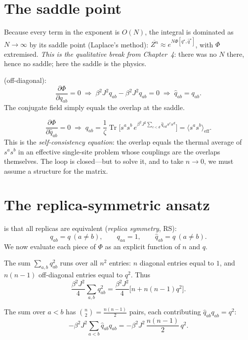 \documentclass[nobib,justified]{tufte-handout}
\newcommand{\dbar}[1]{\overline{#1}}
\newcommand{\Tr}{\operatorname{Tr}}
\begin{document}
\section{The saddle point}

Because every term in the exponent is $O(N)$, the integral is dominated as
$N\to\infty$ by its saddle point (Laplace's method): $\dbar{Z^n}\approx
e^{N\Phi[q^\star,\hat q^\star]}$, with $\Phi$ extremised. \emph{This is the
qualitative break from Chapter~4}: there was no $N$ there, hence no saddle;
here the saddle is the physics.

 (off-diagonal):
\[
  \frac{\partial\Phi}{\partial q_{ab}}=0
  \;\Rightarrow\;
  \beta^2 J^2 q_{ab}-\beta^2 J^2\hat q_{ab}=0
  \;\Rightarrow\; \hat q_{ab}=q_{ab}.
\]
The conjugate field simply equals the overlap at the saddle.

\[
  \frac{\partial\Phi}{\partial\hat q_{ab}}=0
  \;\Rightarrow\;
  q_{ab}=\frac{1}{\zeta}\Tr\Big[s^a s^b\,
     e^{\beta^2 J^2\sum_{c<d}\hat q_{cd}s^c s^d}\Big]
  =\langle s^a s^b\rangle_{\text{eff}}.
\]
This is the \emph{self-consistency equation}: the overlap equals the
thermal average of $s^a s^b$ in an effective single-site problem whose
couplings are the overlaps themselves. The loop is closed---but to solve
it, and to take $n\to0$, we must assume a structure for the matrix.

\section{The replica-symmetric ansatz}
\label{sec:rs}

 is that all replicas are equivalent
(\emph{replica symmetry}, RS):
\[
  q_{ab}=q\ (a\neq b),\qquad q_{aa}=1,\qquad \hat q_{ab}=q\ (a\neq b).
\]
We now evaluate each piece of $\Phi$ as an explicit function of $n$ and
$q$.

 The sum $\sum_{a,b}q_{ab}^2$ runs
over all $n^2$ entries: $n$ diagonal entries equal to $1$, and $n(n-1)$
off-diagonal entries equal to $q^2$. Thus
\[
  \frac{\beta^2 J^2}{4}\sum_{a,b}q_{ab}^2
  = \frac{\beta^2 J^2}{4}\big[n + n(n-1)q^2\big].
\]

 The sum over $a<b$ has
$\binom n2=\frac{n(n-1)}{2}$ pairs, each contributing
$\hat q_{ab}q_{ab}=q^2$:
\[
  -\beta^2 J^2\sum_{a<b}\hat q_{ab}q_{ab}
  = -\beta^2 J^2\,\frac{n(n-1)}{2}\,q^2 .
\]
\end{document}
